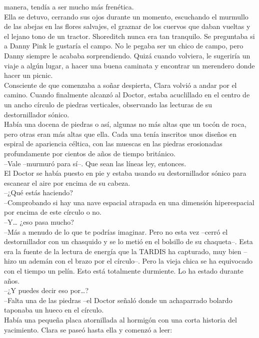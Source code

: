manera, tendía a ser mucho más frenética.\\
Ella se detuvo, cerrando sus ojos durante un momento, escuchando el
murmullo de las abejas en las flores salvajes, el graznar de los cuervos
que daban vueltas y el lejano tono de un tractor. Shoreditch nunca era
tan tranquilo. Se preguntaba si a Danny Pink le gustaría el campo. No le
pegaba ser un chico de campo, pero Danny siempre le acababa
sorprendiendo. Quizá cuando volviera, le sugeriría un viaje a algún
lugar, a hacer una buena caminata y encontrar un merendero donde hacer
un picnic.\\
Consciente de que comenzaba a soñar despierta, Clara volvió a andar por
el camino. Cuando finalmente alcanzó al Doctor, estaba acuclillado en el
centro de un ancho círculo de piedras verticales, observando las
lecturas de su destornillador sónico.\\
Había una docena de piedras o así, algunas no más altas que un tocón de
roca, pero otras eran más altas que ella. Cada una tenía inscritos unos
diseños en espiral de apariencia céltica, con las muescas en las piedras
erosionadas profundamente por cientos de años de tiempo británico.\\
--Vale --murmuró para sí--. Que sean las líneas ley, entonces.\\
El Doctor se había puesto en pie y estaba usando su destornillador
sónico para escanear el aire por encima de su cabeza.\\
--¿Qué estás haciendo?\\
--Comprobando si hay una nave espacial atrapada en una dimensión
hiperespacial por encima de este círculo o no.\\
--Y\ldots{} ¿eso pasa mucho?\\
--Más a menudo de lo que te podrías imaginar. Pero no esta vez --cerró
el destornillador con un chasquido y se lo metió en el bolsillo de su
chaqueta--. Esta era la fuente de la lectura de energía que la TARDIS ha
capturado, muy bien --hizo un ademán con el brazo por el círculo--. Pero
la vieja chica se ha equivocado con el tiempo un pelín. Esto está
totalmente durmiente. Lo ha estado durante años.\\
--¿Y puedes decir eso por\ldots{}?\\
--Falta una de las piedras --el Doctor señaló donde un achaparrado
bolardo taponaba un hueco en el círculo.\\
Había una pequeña placa atornillada al hormigón con una corta historia
del yacimiento. Clara se paseó hasta ella y comenzó a leer:\\
